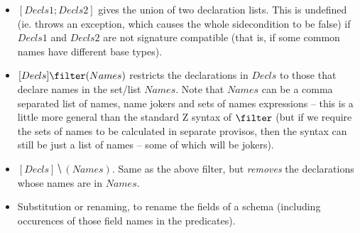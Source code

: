 \documentclass{article}
\begin{document}
\begin{itemize}
\item $[Decls1 ; Decls2]$ gives the union of two declaration lists.
  This is undefined (ie. throws an exception, which causes the whole
  sidecondition to be false) if $Decls1$ and $Decls2$ are not signature
  compatible (that is, if some common names have different base types).
\item $[Decls] \filter (Names)$ restricts the declarations in $Decls$
  to those that declare names in the set/list $Names$.  Note that
  $Names$ can be a comma separated list of names, name jokers and
  sets of names expressions -- this is a little more general than the
  standard Z syntax of $\filter$ (but if we require the sets of names
  to be calculated in separate provisos, then the syntax can still
  be just a list of names -- some of which will be jokers).
\item $[Decls] \hide (Names)$.  Same as the above filter, but
  \emph{removes} the declarations whose names are in $Names$.
\item Substitution or renaming, to rename the fields of a schema
  (including occurences of those field names in the predicates).
\end{itemize}
\end{document}
